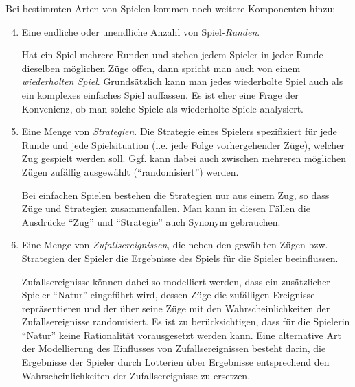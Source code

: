 Bei bestimmten Arten von Spielen kommen noch weitere Komponenten hinzu:

\begin{enumerate}
  \setcounter{enumi}{3}
  \item Eine endliche oder unendliche Anzahl von Spiel-{\em Runden}. 
  
  \begin{footnotesize}
  Hat ein
  Spiel mehrere Runden und stehen jedem Spieler in jeder Runde dieselben
  möglichen Züge offen, dann spricht man auch von einem {\em wiederholten
  Spiel}. Grundsätzlich kann man jedes wiederholte Spiel auch als ein komplexes
  einfaches Spiel auffassen. Es ist eher eine Frage der Konvenienz, ob man
  solche Spiele als wiederholte Spiele analysiert.
  \end{footnotesize}

  \item Eine Menge von {\em Strategien}. Die Strategie eines Spielers
  spezifiziert für jede Runde und jede Spielsituation (i.e. jede Folge
  vorhergehender Züge), welcher Zug gespielt werden soll. Ggf. kann dabei auch
  zwischen mehreren möglichen Zügen zufällig ausgewählt ("`randomisiert"')
  werden. 

  \begin{footnotesize}  
  Bei einfachen Spielen bestehen die Strategien nur aus einem Zug, so
  dass Züge und Strategien zusammenfallen. Man kann in diesen Fällen die
  Ausdrücke "`Zug"' und "`Strategie"' auch Synonym gebrauchen.
  \end{footnotesize}

  \item Eine Menge von {\em Zufallsereignissen}, die neben den gewählten Zügen
  bzw. Strategien der Spieler die Ergebnisse des Spiels für die Spieler beeinflussen.
 
  \begin{footnotesize}
  Zufallsereignisse können dabei so modelliert werden, dass ein zusätzlicher
  Spieler "`Natur"' eingeführt wird, dessen Züge die zufälligen Ereignisse
  repräsentieren und der über seine Züge mit den Wahrscheinlichkeiten der
  Zufallsereignisse randomisiert. Es ist zu berücksichtigen, dass für die
  Spielerin "`Natur"' keine Rationalität vorausgesetzt werden kann. Eine
  alternative Art der Modellierung des Einflusses von Zufallsereignissen besteht 
  darin, die Ergebnisse der Spieler durch Lotterien über Ergebnisse 
  entsprechend den Wahrscheinlichkeiten der Zufallsereignisse zu ersetzen.
  \end{footnotesize}
\end{enumerate}

